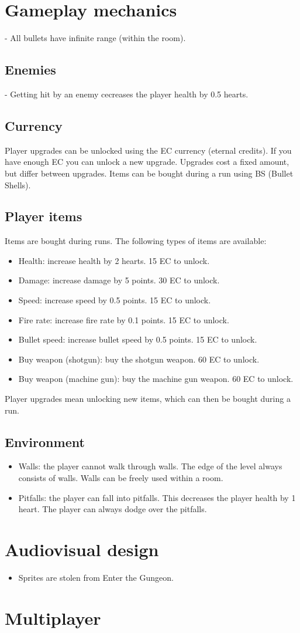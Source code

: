 \documentclass{article}
\begin{document}
\section{Gameplay mechanics}
- All bullets have infinite range (within the room).
\subsection{Enemies}
- Getting hit by an enemy cecreases the player health by 0.5 hearts.

\subsection{Currency}
Player upgrades can be unlocked using the EC currency (eternal credits). If you have enough EC you can unlock a new upgrade.
Upgrades cost a fixed amount, but differ between upgrades.
Items can be bought during a run using BS (Bullet Shells).

\subsection{Player items}
Items are bought during runs. The following types of items are available:
\begin{itemize}
    \item Health: increase health by 2 hearts. 15 EC to unlock.
    \item Damage: increase damage by 5 points. 30 EC to unlock.
    \item Speed: increase speed by 0.5 points. 15 EC to unlock.
    \item Fire rate: increase fire rate by 0.1 points. 15 EC to unlock.
    \item Bullet speed: increase bullet speed by 0.5 points. 15 EC to unlock.
    \item Buy weapon (shotgun): buy the shotgun weapon. 60 EC to unlock.
    \item Buy weapon (machine gun): buy the machine gun weapon. 60 EC to unlock.
\end{itemize}

Player upgrades mean unlocking new items, which can then be bought during a run.

\subsection{Environment}
\begin{itemize}
    \item Walls: the player cannot walk through walls. The edge of the level always consists of walls. Walls can be freely used within a room.
    \item Pitfalls: the player can fall into pitfalls. This decreases the player health by 1 heart. The player can always dodge over the pitfalls.
\end{itemize}

\section{Audiovisual design}
\begin{itemize}
    \item Sprites are stolen from Enter the Gungeon.
\end{itemize}

\section{Multiplayer}
\end{document}
